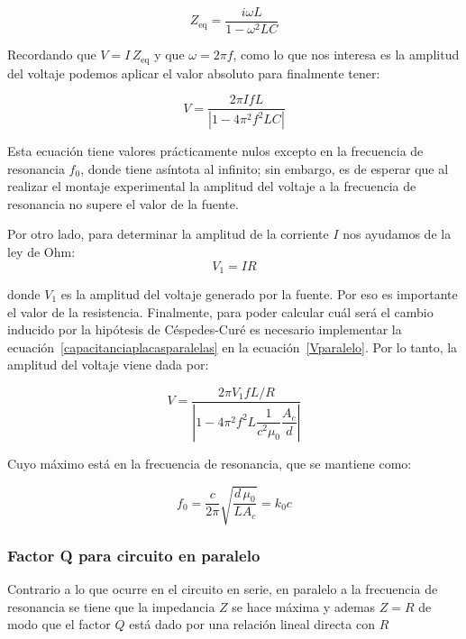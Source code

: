 \begin{equation}
    Z_{\text{eq}} = \frac{i\omega L}{1 - \omega^2 LC}
\end{equation}
 
Recordando que $V = I\,Z_{\text{eq}}$ y que $\omega = 2\pi f$, como lo que nos interesa es la amplitud del voltaje podemos aplicar el valor absoluto para finalmente tener:
 
\begin{equation} \label{Vparalelo}
    V = \frac{2\pi I f L}{\left|1 - 4\pi^2 f^2 LC\right|}
\end{equation}
 
Esta ecuación tiene valores prácticamente nulos excepto en la frecuencia de resonancia $f_0$, donde tiene asíntota al infinito; sin embargo, es de esperar que al realizar el montaje experimental la amplitud del voltaje a la frecuencia de resonancia no supere el valor de la fuente.
 
Por otro lado, para determinar la amplitud de la corriente $I$ nos ayudamos de la ley de Ohm:
\begin{equation}
    V_1 = IR
\end{equation}
 
donde $V_1$ es la amplitud del voltaje generado por la fuente. Por eso es importante el valor de la resistencia. Finalmente, para poder calcular cuál será el cambio inducido por la hipótesis de Céspedes-Curé es necesario implementar la ecuación~\ref{capacitanciaplacasparalelas} en la ecuación~\ref{Vparalelo}. Por lo tanto, la amplitud del voltaje viene dada por:
 
\begin{equation}
    V = \frac{2\pi V_1 f L/R}{\left|1 - 4\pi^2 f^2 L \dfrac{1}{c^2\mu_0}\dfrac{A_c}{d}\right|}
\end{equation}
 
Cuyo máximo está en la frecuencia de resonancia, que se mantiene como:
 
\begin{equation}
    f_0 = \frac{c}{2\pi}\sqrt{\frac{d\,\mu_0}{L A_c}} = k_0 c
\end{equation}
 
\subsubsection{Factor Q para circuito en paralelo}

Contrario a lo que ocurre en el circuito en serie, en paralelo a la frecuencia de resonancia se tiene que la impedancia $Z$ se hace máxima y ademas $Z = R$ de modo que el factor $Q$ está dado por una relación lineal directa con $R$


